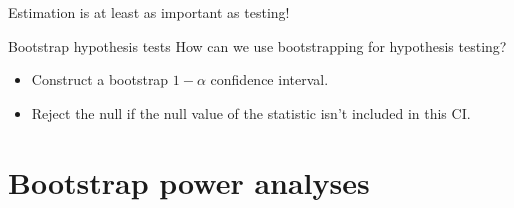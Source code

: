 \documentclass{beamer} %
\begin{document}
\begin{frame}[standout]
Estimation is at least as important as testing! 
\end{frame}

\begin{frame}{Bootstrap hypothesis tests}
How can we use bootstrapping for hypothesis testing?
\begin{itemize}[<+(1)->]
\item Construct a bootstrap $1-\alpha$ confidence interval.
\item Reject the null if the null value of the statistic isn't included in this CI.
\end{itemize}
\end{frame}



\section{Bootstrap power analyses}
\end{document}
